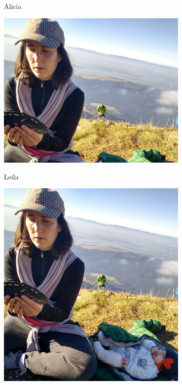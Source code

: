 \documentclass[10pt]{beamer}
\newenvironment{slide}[2][]
  {\begin{frame}[fragile,environment=slide,#1]{#2}}
  {\end{frame}}
\begin{document}
\begin{slide}{Alicia}
\begin{center}
\includegraphics[width=0.7\textwidth]{figures/alicia-1.png}
\end{center}
\end{slide}

\begin{slide}{Leila}
\begin{center}
\includegraphics[width=0.7\textwidth]{figures/alicia-2.png}
\end{center}
\end{slide}
\end{document}
